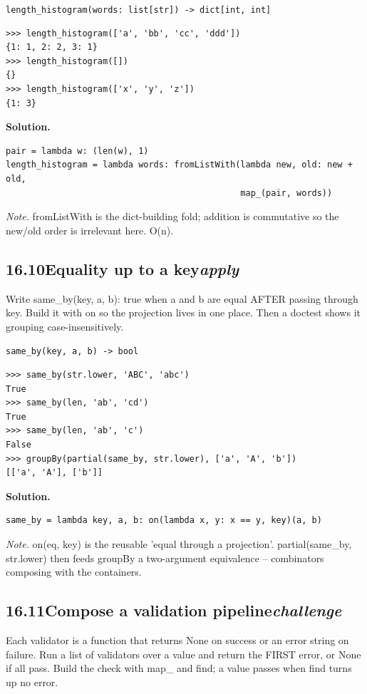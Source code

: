 \documentclass[10pt,letterpaper]{book}
\begin{document}
\noindent\texttt{length\_histogram(words: list[str]) -> dict[int, int]}
\begin{lstlisting}[style=ex]
>>> length_histogram(['a', 'bb', 'cc', 'ddd'])
{1: 1, 2: 2, 3: 1}
>>> length_histogram([])
{}
>>> length_histogram(['x', 'y', 'z'])
{1: 3}
\end{lstlisting}
\noindent\textbf{Solution.}
\begin{lstlisting}[style=code]
pair = lambda w: (len(w), 1)
length_histogram = lambda words: fromListWith(lambda new, old: new + old,
                                              map_(pair, words))
\end{lstlisting}
\noindent\textit{Note.} fromListWith is the dict-building fold; addition is commutative so the new/old order is irrelevant here. O(n).

\subsection*{16.10\quad Equality up to a key\hfill\textnormal{\textit{apply}}}
Write same\_by(key, a, b): true when a and b are equal AFTER passing through key. Build it with on so the projection lives in one place. Then a doctest shows it grouping case-insensitively.

\noindent\texttt{same\_by(key, a, b) -> bool}
\begin{lstlisting}[style=ex]
>>> same_by(str.lower, 'ABC', 'abc')
True
>>> same_by(len, 'ab', 'cd')
True
>>> same_by(len, 'ab', 'c')
False
>>> groupBy(partial(same_by, str.lower), ['a', 'A', 'b'])
[['a', 'A'], ['b']]
\end{lstlisting}
\noindent\textbf{Solution.}
\begin{lstlisting}[style=code]
same_by = lambda key, a, b: on(lambda x, y: x == y, key)(a, b)
\end{lstlisting}
\noindent\textit{Note.} on(eq, key) is the reusable 'equal through a projection'. partial(same\_by, str.lower) then feeds groupBy a two-argument equivalence -- combinators composing with the containers.

\subsection*{16.11\quad Compose a validation pipeline\hfill\textnormal{\textit{challenge}}}
Each validator is a function that returns None on success or an error string on failure. Run a list of validators over a value and return the FIRST error, or None if all pass. Build the check with map\_ and find; a value passes when find turns up no error.
\end{document}
